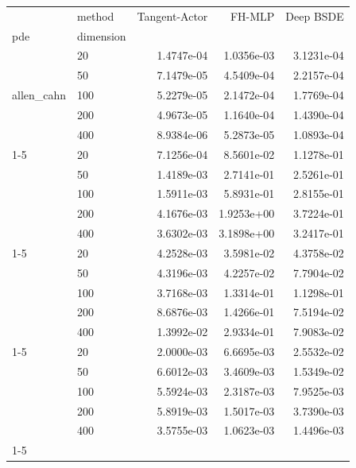 \begin{tabular}{llrrr}
\toprule
 & method & Tangent-Actor & FH-MLP & Deep BSDE \\
pde & dimension &  &  &  \\
\midrule
\multirow[t]{5}{*}{allen\_cahn} & 20 & 1.4747e-04 & 1.0356e-03 & 3.1231e-04 \\
 & 50 & 7.1479e-05 & 4.5409e-04 & 2.2157e-04 \\
 & 100 & 5.2279e-05 & 2.1472e-04 & 1.7769e-04 \\
 & 200 & 4.9673e-05 & 1.1640e-04 & 1.4390e-04 \\
 & 400 & 8.9384e-06 & 5.2873e-05 & 1.0893e-04 \\
\cline{1-5}
\multirow[t]{5}{*}{b6\_fullrank} & 20 & 7.1256e-04 & 8.5601e-02 & 1.1278e-01 \\
 & 50 & 1.4189e-03 & 2.7141e-01 & 2.5261e-01 \\
 & 100 & 1.5911e-03 & 5.8931e-01 & 2.8155e-01 \\
 & 200 & 4.1676e-03 & 1.9253e+00 & 3.7224e-01 \\
 & 400 & 3.6302e-03 & 3.1898e+00 & 3.2417e-01 \\
\cline{1-5}
\multirow[t]{5}{*}{dense\_fourier} & 20 & 4.2528e-03 & 3.5981e-02 & 4.3758e-02 \\
 & 50 & 4.3196e-03 & 4.2257e-02 & 7.7904e-02 \\
 & 100 & 3.7168e-03 & 1.3314e-01 & 1.1298e-01 \\
 & 200 & 8.6876e-03 & 1.4266e-01 & 7.5194e-02 \\
 & 400 & 1.3992e-02 & 2.9334e-01 & 7.9083e-02 \\
\cline{1-5}
\multirow[t]{5}{*}{hjb\_log} & 20 & 2.0000e-03 & 6.6695e-03 & 2.5532e-02 \\
 & 50 & 6.6012e-03 & 3.4609e-03 & 1.5349e-02 \\
 & 100 & 5.5924e-03 & 2.3187e-03 & 7.9525e-03 \\
 & 200 & 5.8919e-03 & 1.5017e-03 & 3.7390e-03 \\
 & 400 & 3.5755e-03 & 1.0623e-03 & 1.4496e-03 \\
\cline{1-5}
\bottomrule
\end{tabular}
